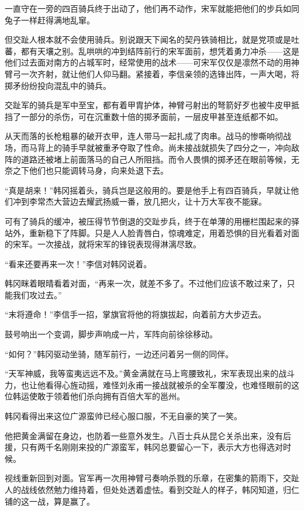 一直守在一旁的四百骑兵终于出动了，他们再不动作，宋军就能把他们的步兵如同兔子一样赶得满地乱窜。

但交趾人根本就不会使用骑兵。别说跟天下闻名的契丹铁骑相比，就是党项或是吐蕃，都有天壤之别。乱哄哄的冲到结阵前行的宋军面前，想凭着勇力冲杀——这是他们过去面对南方的占城军时，经常使用的战术——可宋军仅仅是凛然不动的用神臂弓一次齐射，就让他们人仰马翻。紧接着，李信亲领的选锋出阵，一声大喝，将掷矛纷纷投向混乱中的骑兵。

交趾军的骑兵是军中至宝，都有着甲胄护体，神臂弓射出的弩箭好歹也被牛皮甲抵挡了一部分的杀伤，可在沉重数十倍的掷矛面前，一层皮甲甚至连纸都不如。

从天而落的长枪粗暴的破开衣甲，连人带马一起扎成了肉串。战马的惨嘶响彻战场，而马背上的骑手早就被重矛夺取了性命。尚未接战就损失了四分之一，冲向敌阵的道路还被堵上前面落马的自己人所阻挡。而令人畏惧的掷矛还在眼前等候，无奈之下他们也只能调转马身，向来处退下去。

“真是胡来！”韩冈摇着头，骑兵岂是这般用的。要是他手上有四百骑兵，早就让他们冲到李常杰大营边去耀武扬威一番，放几把火，让十万大军夜不能寐。

可有了骑兵的缓冲，被压得节节倒退的交趾步兵，终于在单薄的用栅栏围起来的驿站外，重新稳下了阵脚。只是人人脸青唇白，惊魂难定，用着恐惧的目光看着对面的宋军。一次接战，就将宋军的锋锐表现得淋漓尽致。

“看来还要再来一次！”李信对韩冈说着。

韩冈眯着眼晴看着对面，“再来一次，就差不多了。不过他们应该不敢过来了，只能我们攻过去。”

“末将遵命！”李信手一招，掌旗官将他的将旗拔起，向着前方大步迈去。

鼓号响出一个变调，脚步声响成一片，军阵向前徐徐移动。

“如何？”韩冈驱动坐骑，随军前行，一边还问着另一侧的同伴。

“天军神威，我等蛮夷远远不及。”黄金满就在马上弯腰致礼，宋军表现出来的战斗力，也让他看得心旌动摇，难怪刘永甫一接战就被杀的全军覆没，也难怪眼前的这位韩运使敢于领着他们杀向拥有百倍大军的邕州。

韩冈看得出来这位广源蛮帅已经心服口服，不无自豪的笑了一笑。

他把黄金满留在身边，也防着一些意外发生。八百士兵从昆仑关杀出来，没有后援，只有两千名刚刚来投的广源蛮军，韩冈总要留心一下，表示大方也得选对时候。

视线重新回到对面。官军再一次用神臂弓奏响杀戮的乐章，在密集的箭雨下，交趾人的战线依然勉力维持着，但处处透着虚怯。看到交趾人的样子，韩冈知道，归仁铺的这一战，算是赢了。

